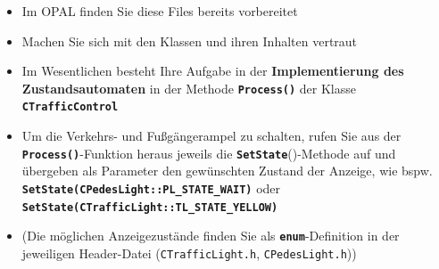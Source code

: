 \documentclass[
    fontsize=12pt,                      %
    paper=a4,                           %
    twoside=off,                       %
    DIV=15,                             %
    BCOR=12mm,                          %
    headings=normal,                    %
    headsepline=false,                   %
    footsepline=false,                  %
    headinclude=true,                   %
    footinclude=false,                  %
    toc=listof,                         %
    toc=bib,                            %
    chapterprefix=false,                %
    appendixprefix=false,               %
    numbers=noendperiod,                %
    captions=tableabove,                %
    footnotes=multiple,                 %
    bibliography=oldstyle,              %
    draft=false,                        %
]{scrreprt}
\newcommand{\Farbcode}[1]{\texttt{\textbf{\textcolor{myred}{#1}}}}
\begin{document}
\begin{itemize}
\item Im OPAL finden Sie diese Files bereits vorbereitet
\item Machen Sie sich mit den Klassen und ihren Inhalten vertraut
\item Im Wesentlichen besteht Ihre Aufgabe in der \textbf{Implementierung des Zustandsautomaten} in der Methode \Farbcode{Process()} der Klasse \Farbcode{CTrafficControl}
\item Um die Verkehrs- und Fußgängerampel zu schalten, rufen Sie aus der \Farbcode{Process()}-Funktion heraus jeweils die \Farbcode{SetState}()-Methode auf und übergeben als Parameter den gewünschten Zustand der Anzeige, wie bspw. \\ 
\Farbcode{SetState(CPedesLight::PL\_STATE\_WAIT)} oder \\
\Farbcode{SetState(CTrafficLight::TL\_STATE\_YELLOW)} 
\item [] (Die möglichen Anzeigezustände finden Sie als \Farbcode{enum}-Definition in der jeweiligen Header-Datei (\texttt{CTrafficLight.h},  \texttt{CPedesLight.h}))
\end{itemize}

 
\end{document}
